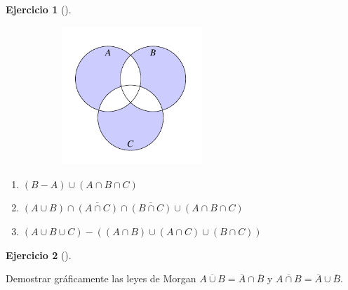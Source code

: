 \documentclass[
  a4paper,
]{scrreport}
\providecommand{\tightlist}{%
  \setlength{\itemsep}{0pt}\setlength{\parskip}{0pt}}\usepackage{longtable,booktabs,array}
\theoremstyle{definition}
\newtheorem{exercise}{Ejercicio}[chapter]
\theoremstyle{remark}
\begin{document}
\begin{exercise}[]
\begin{figure}
\begin{minipage}{0.33\linewidth}
\end{minipage}%
%
\begin{minipage}{0.33\linewidth}

\begin{figure}[H]

{\centering \includegraphics[width=2.08333in,height=\textheight]{./img/teoria-conjuntos/conjunto3.pdf}

}


\end{figure}%

\end{minipage}%

\end{figure}%

\end{exercise}

\begin{tcolorbox}[enhanced jigsaw, left=2mm, coltitle=black, colbacktitle=quarto-callout-tip-color!10!white, opacitybacktitle=0.6, colback=white, breakable, titlerule=0mm, toptitle=1mm, rightrule=.15mm, bottomtitle=1mm, bottomrule=.15mm, toprule=.15mm, leftrule=.75mm, arc=.35mm, opacityback=0, title=\textcolor{quarto-callout-tip-color}{\faLightbulb}\hspace{0.5em}{Solución}, colframe=quarto-callout-tip-color-frame]

\begin{enumerate}
\def\labelenumi{\alph{enumi}.}
\tightlist
\item
  \((B-A)\cup (A\cap B\cap C)\)
\item
  \((A\cup B)\cap \overline{(A\cap C)}\cap \overline{(B\cap C)}\cup (A\cap B\cap C)\)
\item
  \((A\cup B\cup C) - ((A\cap B)\cup (A\cap C)\cup (B\cap C))\)
\end{enumerate}

\end{tcolorbox}

\begin{exercise}[]\protect\hypertarget{exr-leyes-morgan}{}\label{exr-leyes-morgan}

Demostrar gráficamente las leyes de Morgan
\(\overline{A\cup B}=\overline A \cap \overline B\) y
\(\overline{A\cap B}=\overline A \cup \overline B\).

\end{exercise}
\end{document}

